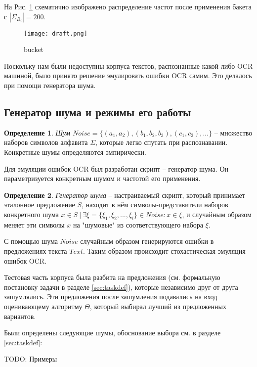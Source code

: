 \documentclass[14pt,russian]{extreport}
\theoremstyle{definition}
\newtheorem{definition}{Определение}[subsection]
\newcommand{\todo}[1]{}
\renewcommand{\todo}[1]{{\color{red} TODO: {#1}}}
\begin{document}
На Рис. \ref{fig:bucket_pic} схематично изображено распределение частот после применения бакета с $|\Sigma_{B_i}| = 200$.

\begin{figure}[H]
	\centering
	\texttt{[image: draft.png]}
	\caption{bucket}
	\label{fig:bucket_pic}
\end{figure}

Поскольку нам были недоступны корпуса текстов, распознанные какой-либо OCR машиной, было принято решение эмулировать ошибки OCR самим. Это делалось при помощи генератора шума.

\subsection{ Генератор шума и режимы его работы }

\begin{definition}
	{\textit{Шум $Noise = \{ (a_1, a_2), (b_1, b_2, b_3), (c_1, c_2), ... \}$}} -- множество наборов символов алфавита $\Sigma$, которые легко спутать при распознавании. Конкретные шумы определяются эмпирически. 
\end{definition}

Для эмуляции ошибок OCR был разработан скрипт -- генератор шума. Он параметризуется конкретным шумом и частотой его применения.

\begin{definition}
	{\textit{Генератор шума}} -- настраиваемый скрипт, который принимает эталонное предложение $S$, находит в нём символы-представители наборов конкретного шума $x \in S\ |\ \exists \xi = \{ \xi_1, \xi_2, ..., \xi_l \} \in Noise : x \in \xi$, и случайным образом меняет эти символы $x$ на "шумовые" из соответствующего набора $\xi$.
\end{definition}

С помощью шума $Noise$ случайным образом генерируются ошибки в предложениях текста $Text$. Таким образом происходит стохастическая эмуляция ошибок OCR. 

Тестовая часть корпуса была разбита на предложения (см. формальную постановку задачи в разделе \ref{sec:taskdef}), которые независимо друг от друга зашумлялись. Эти предложения после зашумления подавались на вход оценивающему алгоритму $\Theta$, который выбирал лучший из предложенных вариантов.

Были определены следующие шумы, обоснование выбора см. в разделе \ref{sec:taskdef}: 

\todo{Примеры}
\end{document}
